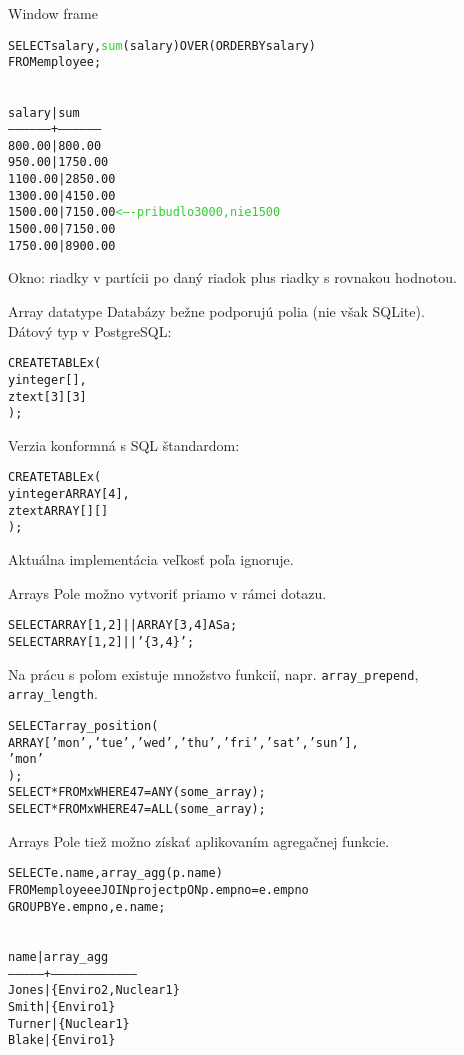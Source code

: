 \documentclass[12pt]{beamer}
\def\blue#1{\textcolor{Cerulean}{#1}}
\def\green#1{\textcolor{LimeGreen}{#1}}
\begin{document}
\begin{frame}[fragile]{Window frame}
\begin{alltt}
SELECT salary, \green{sum}(salary) \alert{OVER (ORDER BY salary)}
FROM employee;
\end{alltt}
{\scriptsize
\begin{alltt}
\blue{
 salary  |   sum
------------------+-----------------
  800.00 |   800.00
  950.00 |  1750.00
 1100.00 |  2850.00
 1300.00 |  4150.00
 1500.00 |  7150.00   \green{<---- pribudlo 3000, nie 1500}
 1500.00 |  7150.00
 1750.00 |  8900.00
}
\end{alltt}
}
Okno: riadky v partícii po daný riadok plus riadky s rovnakou hodnotou.
\end{frame}

\begin{frame}[fragile]{Array datatype}
Databázy bežne podporujú polia (nie však SQLite).\\
Dátový typ v PostgreSQL:
\begin{alltt}
  CREATE TABLE x (
      y  integer[],
      z  text[3][3]
  );
\end{alltt}
Verzia konformná s SQL štandardom:
\begin{alltt}
  CREATE TABLE x (
      y  integer ARRAY[4],
      z  text ARRAY[][]
  );
\end{alltt}
Aktuálna implementácia veľkosť poľa ignoruje.
\end{frame}

\begin{frame}[fragile]{Arrays}
Pole možno vytvoriť priamo v rámci dotazu.
\begin{alltt}
SELECT ARRAY[1,2] || ARRAY[3,4] AS a;
SELECT ARRAY[1, 2] || '\{3, 4\}';
\end{alltt}
Na prácu s poľom existuje množstvo funkcií, napr. \verb|array_prepend|, \verb|array_length|.
\begin{alltt}
SELECT array_position(
    ARRAY['mon','tue','wed','thu','fri','sat','sun'],
    'mon'
  );
SELECT * FROM x WHERE 47 = ANY (some_array);
SELECT * FROM x WHERE 47 = ALL (some_array);
\end{alltt}
\end{frame}

\begin{frame}[fragile]{Arrays}
Pole tiež možno získať aplikovaním agregačnej funkcie.
\begin{alltt}
SELECT e.name, \alert{array_agg}(p.name)
FROM employee e JOIN project p ON p.empno = e.empno
GROUP BY e.empno, e.name;
\end{alltt}
\begin{alltt}
\blue{
  name  |     array_agg
---------------+-----------------------------------
 Jones  | \{Enviro2,Nuclear1\}
 Smith  | \{Enviro1\}
 Turner | \{Nuclear1\}
 Blake  | \{Enviro1\}
}
\end{alltt}
\end{frame}
\end{document}
